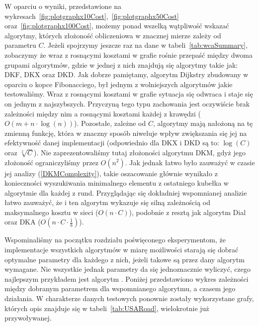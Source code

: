 W oparciu o wyniki, przedstawione na wykresach~\ref{fig:plotgraphx10Cost},~\ref{fig:plotgraphx50Cost} oraz~\ref{fig:plotgraphx100Cost}, możemy ponad wszelką wątpliwość wskazać algorytmy, których złożoność obliczeniowa w znacznej mierze zależy od parametru $C$.
Jeżeli spojrzymy jeszcze raz na dane w tabeli~\ref{tab:wcaSummary}, zobaczymy że wraz z rosnącymi kosztami w grafie rośnie przepaść między dwoma grupami algorytmów, gdzie w jednej z nich znajdują się algorytmy takie jak: \textsc{DKF}, \textsc{DKX} oraz \textsc{DKD}.
Jak dobrze pamiętamy, algorytm Dijkstry zbudowany w oparciu o kopce Fibonacciego, był jednym z wolniejszych algorytmów jakie testowaliśmy.
Wraz z rosnącymi kosztami w grafie sytuacja się odwraca i staje się on jednym z najszybszych.
Przyczyną tego typu zachowania jest oczywiście brak zależności między nim a rosnącymi kosztami każdej z krawędzi ($O \left( m + n \cdot \log \left( n \right) \right)$).
Pozostałe, zależne od $C$, algorytmy mają nałożoną na tę zmienną funkcję, która w znaczny sposób niweluje wpływ zwiększania się jej na efektywność danej implementacji (odpowiednio dla \textsc{DKX} i \textsc{DKD} są to: $\log \left( C \right)$ oraz $\sqrt[2]{C}$).
Nie zaprezentowaliśmy tutaj złożoności algorytmu \textsc{DKM}, gdyż jego złożoność ograniczyliśmy przez $O \left( n^{2} \right)$.
Jak jednak łatwo było zauważyć w czasie jej analizy (\ref{DKMComplexity}), takie oszacowanie głównie wynikało z konieczności wyszukiwania minimalnego elementu z ostatniego kubełka w algorytmie dla każdej z rund.
Przyglądając się dokładniej wspomnianej analizie łatwo zauważyć, że i ten algorytm wykazuje się silną zależnością od maksymalnego kosztu w sieci ($O \left( n \cdot C \right)$), podobnie z resztą jak algorytm Dial oraz \textsc{DKA} ($O \left( n \cdot C \cdot \frac{1}{b} \right)$).

Wspominaliśmy na początku rozdziału poświęconego eksperymentom, że implementacje wszystkich algorytmów w miarę możliwości starają się dobrać optymalne parametry dla każdego z nich, jeżeli takowe są przez dany algorytm wymagane.
Nie wszystkie jednak parametry da się jednoznacznie wyliczyć, czego najlepszym przykładem jest algorytm .
Poniżej przedstawiono wykres zależności między dobranym parametrem dla wspomnianego algorytmu, a czasem jego działania.
W charakterze danych testowych ponownie zostały wykorzystane grafy, których opis znajduje się w tabeli~\ref{tab:USARoad}, wielokrotnie już przywoływanej.

